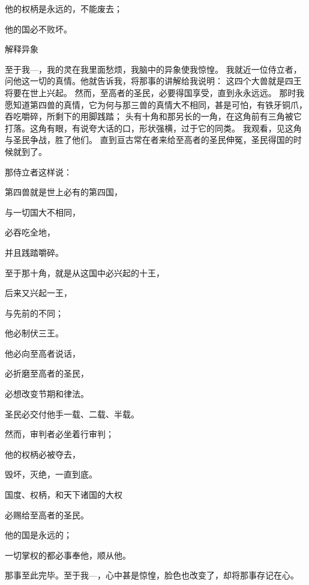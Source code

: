 {\par }{\Q 他的权柄是永远的，不能废去；
\par }{\Q 他的国必不败坏。
\par }{\SH 解释异象
\par }{\PP {}至于我—{}，我的灵在我里面愁烦，我脑中的异象使我惊惶。
我就近一位侍立者，问他这一切的真情。他就告诉我，将那事的讲解给我说明：
这四个大兽就是四王将要在世上兴起。
然而，至高者的圣民，必要得国享受，直到永永远远。
那时我愿知道第四兽的真情，它为何与那三兽的真情大不相同，甚是可怕，有铁牙铜爪，吞吃嚼碎，所剩下的用脚践踏；
头有十角和那另长的一角，在这角前有三角被它打落。这角有眼，有说夸大话的口，形状强横，过于它的同类。
我观看，见这角与圣民争战，胜了他们。
直到亘古常在者来给至高者的圣民伸冤，圣民得国的时候就到了。
\par }{\Q {}那侍立者这样说：
\par }{\Q 第四兽就是世上必有的第四国，
\par }{\Q 与一切国大不相同，
\par }{\Q 必吞吃全地，
\par }{\Q 并且践踏嚼碎。
\par }{\Q {}至于那十角，就是从这国中必兴起的十王，
\par }{\Q 后来又兴起一王，
\par }{\Q 与先前的不同；
\par }{\Q 他必制伏三王。
\par }{\Q {}他必向至高者说{}话，
\par }{\Q 必折磨至高者的圣民，
\par }{\Q 必想改变节期和律法。
\par }{\Q 圣民必交付他手一载、二载、半载。
\par }{\Q {}然而，审判者必坐着行审判；
\par }{\Q 他的权柄必被夺去，
\par }{\Q 毁坏，灭绝，一直到底。
\par }{\Q {}国度、权柄，和天下诸国的大权
\par }{\Q 必赐给至高者的圣民。
\par }{\Q 他的国是永远的；
\par }{\Q 一切掌权的都必事奉他，顺从他。
\par }{\PP {}那事至此完毕。至于我—{}，心中甚是惊惶，脸色也改变了，却将那事存记在心。

}
